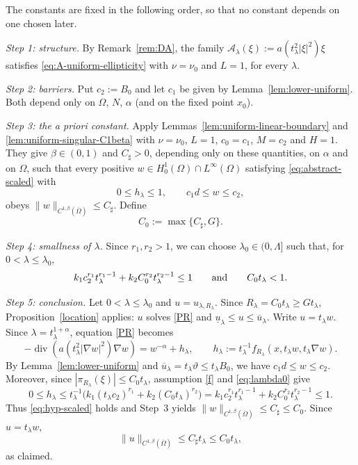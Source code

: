 \documentclass[11pt,leqno]{amsart}
\makeatletter
\renewenvironment{proof}[1][\proofname]{%
  \par
  \pushQED{\qed}%
  \normalfont
  \topsep6\p@\@plus6\p@\relax
  \trivlist
  \item[\hskip\labelsep\itshape #1\@addpunct{.}]%
  \hspace{0.5em}\ignorespaces
}{%
  \popQED
  \endtrivlist\@endpefalse
}
\makeatother
\begin{document}
\begin{proof}
The constants are fixed in the following order, so that no constant
depends on one chosen later.

\emph{Step 1: structure.} By Remark~\ref{rem:DA}, the family
$\mathcal A_\lambda(\xi):=a(t_\lambda^2|\xi|^2)\xi$ satisfies
\eqref{eq:A-uniform-ellipticity} with $\nu=\nu_0$ and $L=1$, for every
$\lambda$.

\emph{Step 2: barriers.} Put $c_2:=B_0$ and let $c_1$ be given by
Lemma~\ref{lem:lower-uniform}. Both depend only on $\Omega$, $N$,
$\alpha$ (and on the fixed point $x_0$).

\emph{Step 3: the a priori constant.} Apply
Lemmas~\ref{lem:uniform-linear-boundary} and
\ref{lem:uniform-singular-C1beta} with $\nu=\nu_0$, $L=1$, $c_0=c_1$,
$M=c_2$ and $H=1$. They give $\beta\in(0,1)$ and $C_\sharp>0$, depending
only on these quantities, on $\alpha$ and on $\Omega$, such that every
positive $w\in H_0^1(\Omega)\cap L^\infty(\Omega)$ satisfying
\eqref{eq:abstract-scaled} with
\begin{equation}\label{eq:hyp-scaled}
0\le h_\lambda\le1,\qquad c_1d\le w\le c_2,
\end{equation}
obeys $\|w\|_{C^{1,\beta}(\overline\Omega)}\le C_\sharp$. Define
\[
C_0:=\max\{C_\sharp,G\}.
\]

\emph{Step 4: smallness of $\lambda$.} Since $r_1,r_2>1$, we can choose
$\lambda_0\in(0,\Lambda]$ such that, for $0<\lambda\le\lambda_0$,
\begin{equation}\label{eq:lambda0}
k_1c_2^{r_1}t_\lambda^{r_1-1}+k_2C_0^{r_2}t_\lambda^{r_2-1}\le1
\qquad\hbox{and}\qquad C_0t_\lambda<1 .
\end{equation}

\emph{Step 5: conclusion.} Let $0<\lambda\le\lambda_0$ and
$u=u_{\lambda,R_\lambda}$. Since $R_\lambda=C_0t_\lambda\ge Gt_\lambda$,
Proposition~\ref{location} applies: $u$ solves \eqref{PR} and
$\underline u_\lambda\le u\le\overline u_\lambda$. Write $u=t_\lambda w$.
Since $\lambda=t_\lambda^{1+\alpha}$, equation \eqref{PR} becomes
\begin{equation}\label{scaled}
-\operatorname{div}\left(a(t_\lambda^2|\nabla w|^2)\nabla w\right)
=w^{-\alpha}
+h_\lambda,\qquad
h_\lambda:=t_\lambda^{-1}f_{R_\lambda}
(x,t_\lambda w,t_\lambda\nabla w).
\end{equation}
By Lemma~\ref{lem:lower-uniform} and
$\overline u_\lambda=t_\lambda\vartheta\le t_\lambda B_0$, we have
$c_1d\le w\le c_2$. Moreover, since $|\pi_{R_\lambda}(\xi)|\le C_0t_\lambda$,
assumption \eqref{f} and \eqref{eq:lambda0} give
\[
0\le h_\lambda
\le t_\lambda^{-1}\bigl(k_1(t_\lambda c_2)^{r_1}+k_2(C_0t_\lambda)^{r_2}\bigr)
=k_1c_2^{r_1}t_\lambda^{r_1-1}+k_2C_0^{r_2}t_\lambda^{r_2-1}\le1 .
\]
Thus \eqref{eq:hyp-scaled} holds and Step~3 yields
$\|w\|_{C^{1,\beta}(\overline\Omega)}\le C_\sharp\le C_0$. Since
$u=t_\lambda w$,
\[
\|u\|_{C^{1,\beta}(\overline\Omega)}\le C_\sharp t_\lambda\le C_0t_\lambda,
\]
as claimed.
\end{proof}
\end{document}
